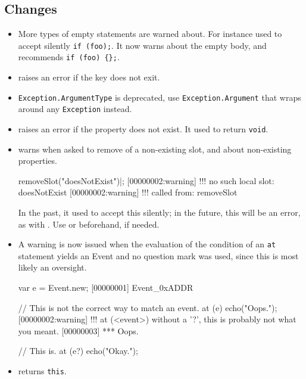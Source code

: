 \subsection{Changes}
\begin{itemize}
\item More types of empty statements are warned about.  For instance \urbi
  used to accept silently \lstinline|if (foo);|.  It now warns about the empty
  body, and recommends \lstinline|if (foo) {};|.

\item {} raises an error if the key does not exit.

\item \lstinline|Exception.ArgumentType| is deprecated, use
  \lstinline|Exception.Argument| that wraps around any \lstinline|Exception|
  instead.

\item {} raises an error if the property does not
  exist.  It used to return \lstinline|void|.

\item {} warns when asked to remove of a
  non-existing slot, and  about non-existing
  properties.
\begin{urbiscript}
removeSlot("doesNotExist")|;
[00000002:warning] !!! no such local slot: doesNotExist
[00000002:warning] !!!    called from: removeSlot
\end{urbiscript}
  In the past, it used to accept this silently; in the future, this will be
  an error, as with .  Use
   or 
  beforehand, if needed.

\item A warning is now issued when the evaluation of the condition of an
  \lstinline|at| statement yields an Event and no question mark was used,
  since this is most likely an oversight.

\begin{urbiunchecked}
var e = Event.new;
[00000001] Event_0xADDR

// This is not the correct way to match an event.
at (e) echo("Oops.");
[00000002:warning] !!! at (<event>) without a '?', this is probably not what you meant.
[00000003] *** Oops.

// This is.
at (e?) echo("Okay.");
\end{urbiunchecked}

\item {} returns \lstinline|this|.
\end{itemize}


